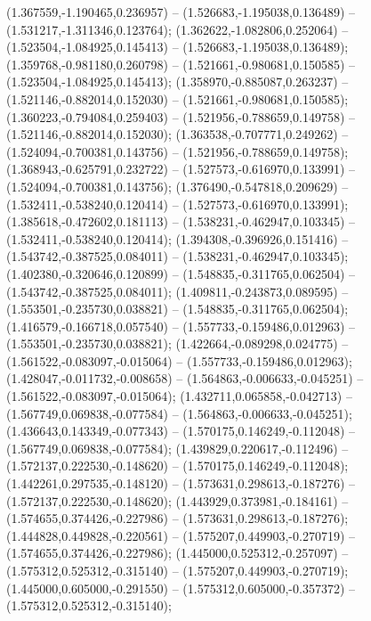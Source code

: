  (1.367559,-1.190465,0.236957) -- (1.526683,-1.195038,0.136489) -- (1.531217,-1.311346,0.123764);
 (1.362622,-1.082806,0.252064) -- (1.523504,-1.084925,0.145413) -- (1.526683,-1.195038,0.136489);
 (1.359768,-0.981180,0.260798) -- (1.521661,-0.980681,0.150585) -- (1.523504,-1.084925,0.145413);
 (1.358970,-0.885087,0.263237) -- (1.521146,-0.882014,0.152030) -- (1.521661,-0.980681,0.150585);
 (1.360223,-0.794084,0.259403) -- (1.521956,-0.788659,0.149758) -- (1.521146,-0.882014,0.152030);
 (1.363538,-0.707771,0.249262) -- (1.524094,-0.700381,0.143756) -- (1.521956,-0.788659,0.149758);
 (1.368943,-0.625791,0.232722) -- (1.527573,-0.616970,0.133991) -- (1.524094,-0.700381,0.143756);
 (1.376490,-0.547818,0.209629) -- (1.532411,-0.538240,0.120414) -- (1.527573,-0.616970,0.133991);
 (1.385618,-0.472602,0.181113) -- (1.538231,-0.462947,0.103345) -- (1.532411,-0.538240,0.120414);
 (1.394308,-0.396926,0.151416) -- (1.543742,-0.387525,0.084011) -- (1.538231,-0.462947,0.103345);
 (1.402380,-0.320646,0.120899) -- (1.548835,-0.311765,0.062504) -- (1.543742,-0.387525,0.084011);
 (1.409811,-0.243873,0.089595) -- (1.553501,-0.235730,0.038821) -- (1.548835,-0.311765,0.062504);
 (1.416579,-0.166718,0.057540) -- (1.557733,-0.159486,0.012963) -- (1.553501,-0.235730,0.038821);
 (1.422664,-0.089298,0.024775) -- (1.561522,-0.083097,-0.015064) -- (1.557733,-0.159486,0.012963);
 (1.428047,-0.011732,-0.008658) -- (1.564863,-0.006633,-0.045251) -- (1.561522,-0.083097,-0.015064);
 (1.432711,0.065858,-0.042713) -- (1.567749,0.069838,-0.077584) -- (1.564863,-0.006633,-0.045251);
 (1.436643,0.143349,-0.077343) -- (1.570175,0.146249,-0.112048) -- (1.567749,0.069838,-0.077584);
 (1.439829,0.220617,-0.112496) -- (1.572137,0.222530,-0.148620) -- (1.570175,0.146249,-0.112048);
 (1.442261,0.297535,-0.148120) -- (1.573631,0.298613,-0.187276) -- (1.572137,0.222530,-0.148620);
 (1.443929,0.373981,-0.184161) -- (1.574655,0.374426,-0.227986) -- (1.573631,0.298613,-0.187276);
 (1.444828,0.449828,-0.220561) -- (1.575207,0.449903,-0.270719) -- (1.574655,0.374426,-0.227986);
 (1.445000,0.525312,-0.257097) -- (1.575312,0.525312,-0.315140) -- (1.575207,0.449903,-0.270719);
 (1.445000,0.605000,-0.291550) -- (1.575312,0.605000,-0.357372) -- (1.575312,0.525312,-0.315140);
